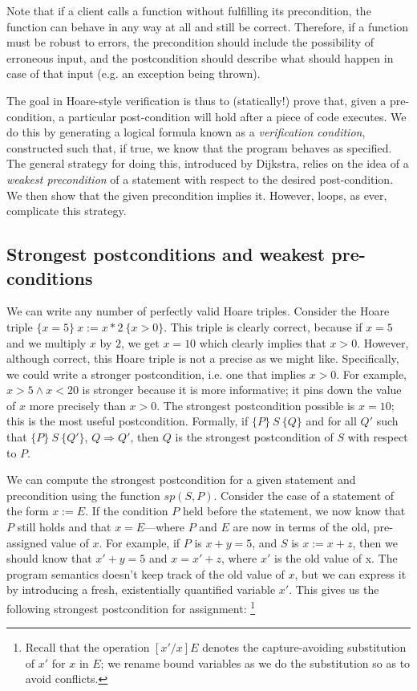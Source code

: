 \documentclass[11pt]{article}
\begin{document}
Note that if a client calls a function without fulfilling its precondition, the
function can behave in any way at all and still be correct.  Therefore, if
a function must be robust to errors, the precondition should include
the possibility of erroneous input, and the postcondition should describe what
should happen in case of that input (e.g. an exception being thrown).

The goal in Hoare-style verification is thus to (statically!) prove that, given
a pre-condition, a particular post-condition will hold after a piece of code
executes.  We do this by generating a logical formula known as a
\emph{verification condition}, constructed such that, if true, we know that the program
behaves as specified.  The general strategy for doing this, introduced by
Dijkstra, relies on the idea of a \emph{weakest precondition} of a statement
with respect to the desired post-condition.  We then show that the
given precondition implies it.  However, loops, as ever, complicate this
strategy.

\subsection{Strongest postconditions and weakest pre-conditions}

We can write any number of perfectly valid Hoare triples.  Consider the Hoare
triple $\{x = 5\} ~x := x * 2~ \{ x > 0 \}$.  This triple is clearly correct,
because if $x=5$ and we multiply $x$ by $2$, we get $x=10$ which clearly implies
that $x>0$.  However, although correct, this Hoare triple is not a precise as we
might like.  Specifically, we could write a stronger postcondition, i.e. one
that implies $x>0$.  For example, $x>5 \land x < 20$ is stronger because it is
more informative; it pins down the value of $x$ more precisely than $x>0$.  The
strongest postcondition possible is $x=10$; this is the most useful
postcondition.  Formally, if $\{P\} ~S~ \{Q\}$ and for all $Q'$ such that
$\{P\} ~S~ \{Q'\}$, $Q \Rightarrow Q'$, then $Q$ is the strongest
postcondition of $S$ with respect to $P$.

We can compute the strongest postcondition for a given statement and
precondition using the function $sp(S, P)$.  Consider the case of a statement of
the form $x := E$.  If the condition $P$ held before the statement, we now know
that $P$ still holds and that $x=E$---where $P$ and $E$ are now in terms of the
old, pre-assigned value of $x$.  For example, if $P$ is $x + y = 5$, and $S$ is
$x := x + z$, then we should know that $x' + y = 5$ and $x = x' + z$, where $x'$
is the old value of x.  The program semantics doesn't keep track of the old
value of $x$, but we can express it by introducing a fresh, existentially
quantified variable $x'$.  This gives us the following strongest postcondition
for assignment:%
\footnote{Recall that the operation $[x'/x]E$ denotes the capture-avoiding substitution of
$x'$ for $x$ in $E$; we rename bound variables as we do the substitution so as to
avoid conflicts.}
\end{document}
